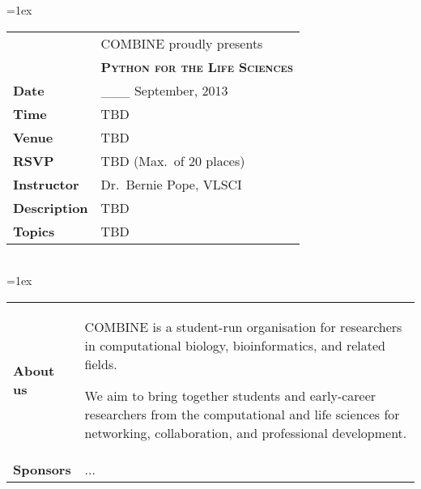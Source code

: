 \documentclass[12pt,a4paper]{article}
\begin{document}

    \thispagestyle{empty}
    \noindent
    \vfill
    \raggedleft
    \begin{minipage}[c]{0.8\textwidth}
        \extrarowsep=1ex
        \begin{tabu} to 0.9\linewidth {X[1]X[5]}
            & COMBINE proudly presents\\[0.5ex]
            &\raggedright {\LARGE\scshape\bfseries Python for the Life
        Sciences}\\[3ex]
            \raggedleft\textbf{Date} & \_\_\_ September, 2013\\
            \raggedleft\textbf{Time} & TBD\\
            \raggedleft\textbf{Venue} & TBD\\
            \raggedleft\textbf{RSVP} & TBD (Max.~of 20 places)\\
            \raggedleft\textbf{Instructor} & Dr.~Bernie Pope, VLSCI\\
            \raggedleft\textbf{Description} & TBD\\
            \raggedleft\textbf{Topics} & TBD
        \end{tabu}\\[7ex]
        \extrarowsep=1ex
        \begin{tabu} to 0.9\linewidth {X[1]X[5]}
            \raggedleft\textbf{About us}&\raggedright 
            COMBINE is a student-run organisation for researchers in
            computational biology, bioinformatics, and related fields.\linebreak
            
            We aim to
            bring together students and early-career researchers from the
            computational and life sciences for networking, collaboration, and
            professional development.\\
            \raggedleft\textbf{Sponsors}&\raggedright
            ...
        \end{tabu}
    \end{minipage}
    \vfill
\end{document}
